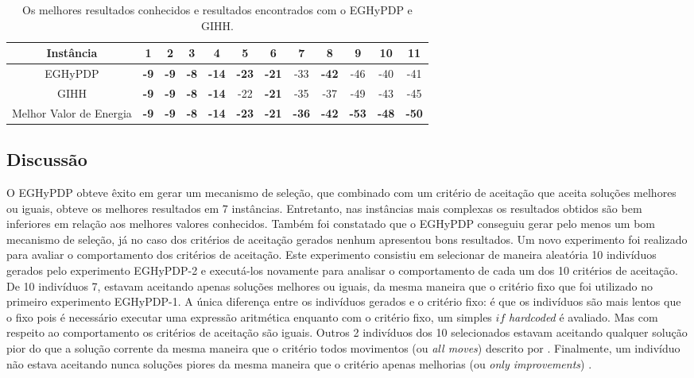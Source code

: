 	\begin{table}[]
		\centering
		\caption{Os melhores resultados conhecidos e resultados encontrados com o EGHyPDP e GIHH.}
		\label{tab:gihhandbhlh}
		\begin{tabular}{cccccccccccc}
			Instância         & 1 & 2 & 3 & 4  & 5  & 6  & 7  & 8  & 9  & 10 & 11 \\ \hline
			EGHyPDP  & \textbf{-9}   & \textbf{-9}    & \textbf{-8}   & \textbf{-14}   & \textbf{-23}   & \textbf{-21}  & -33  & \textbf{-42}   & -46   & -40   & -41   \\ \hline
			GIHH   & \textbf{-9} & \textbf{-9} & \textbf{-8} & \textbf{-14} & -22 & \textbf{-21} & -35 & -37 & -49 & -43 & -45 \\ \hline
			Melhor Valor de Energia   & \textbf{-9} & \textbf{-9} & \textbf{-8} & \textbf{-14} & \textbf{-23} & \textbf{-21} & \textbf{-36} & \textbf{-42} & \textbf{-53} & \textbf{-48} & \textbf{-50}
		\end{tabular}
	\end{table}
	
	
	\subsection{Discussão}
	O EGHyPDP obteve êxito em gerar um mecanismo de seleção, que combinado com um critério de aceitação que aceita soluções melhores ou iguais, obteve os melhores resultados em 7 instâncias. Entretanto, nas instâncias mais complexas os resultados obtidos são bem inferiores em relação aos melhores valores conhecidos. Também foi constatado que o EGHyPDP conseguiu gerar pelo menos um bom mecanismo de seleção, já no caso dos critérios de aceitação gerados nenhum apresentou bons resultados. Um novo experimento foi realizado para avaliar o comportamento dos critérios de aceitação. Este experimento consistiu em selecionar de maneira aleatória 10 indivíduos gerados pelo experimento EGHyPDP-2 e executá-los novamente para analisar o comportamento de cada um dos 10 critérios de aceitação.
	De 10 indivíduos 7, estavam  aceitando apenas soluções melhores ou iguais, da mesma maneira que o critério fixo que foi utilizado no primeiro experimento EGHyPDP-1. A única diferença entre os indivíduos gerados e o critério fixo: é que os indivíduos são mais lentos que o fixo pois é necessário executar uma expressão aritmética enquanto com o critério fixo, um simples $if$ \textit{hardcoded} é avaliado. Mas com respeito ao comportamento os critérios de aceitação são iguais. Outros 2 indivíduos dos 10 selecionados estavam aceitando qualquer solução pior do que a solução corrente da mesma maneira que o critério todos movimentos (ou \textit{all moves})  descrito por \cite{burke2013hyper}. Finalmente, um indivíduo não estava aceitando nunca soluções piores da mesma maneira que o critério apenas melhorias (ou \textit{only improvements})        
	 \cite{burke2013hyper}.
	
